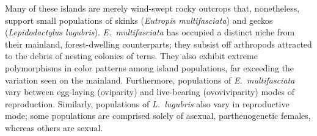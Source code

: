 Many of these islands are merely wind-swept rocky outcrops that, nonetheless,
support small populations of skinks (\emph{Eutropis multifasciata}) and geckos
(\emph{Lepidodactylus lugubris}).
\emph{E.\ multifasciata} has occupied a distinct niche from their mainland,
forest-dwelling counterparts; they subsist off arthropods attracted to the
debris of nesting colonies of terns.
They also exhibit extreme polymorphisms in color patterns among island
populations, far exceeding the variation seen on the mainland.
Furthermore, populations of \emph{E.\ multifasciata} vary between egg-laying
(oviparity) and live-bearing (ovoviviparity) modes of reproduction.
Similarly, populations of \emph{L.\ lugubris} also vary in reproductive mode;
some populations are comprised solely of asexual, parthenogenetic females,
whereas others are sexual.

